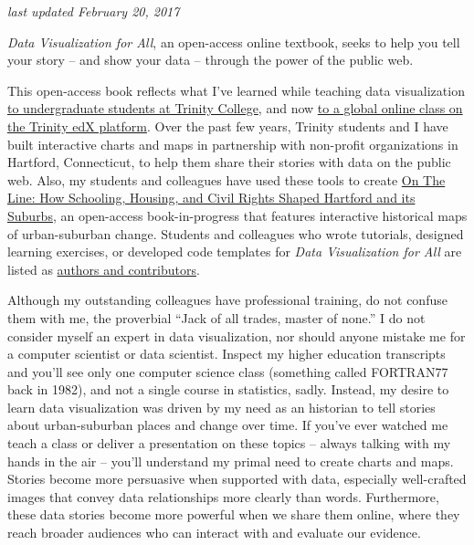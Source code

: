\documentclass[
  english,
]{book}
\begin{document}
\emph{last updated February 20, 2017}

\emph{Data Visualization for All}, an open-access online textbook, seeks to help you tell your story -- and show your data -- through the power of the public web.

This open-access book reflects what I've learned while teaching data visualization \href{http://commons.trincoll.edu/dataviz}{to undergraduate students at Trinity College}, and now \href{https://www.edx.org/school/trinityx}{to a global online class on the Trinity edX platform}. Over the past few years, Trinity students and I have built interactive charts and maps in partnership with non-profit organizations in Hartford, Connecticut, to help them share their stories with data on the public web. Also, my students and colleagues have used these tools to create \href{http://ontheline.trincoll.edu}{On The Line: How Schooling, Housing, and Civil Rights Shaped Hartford and its Suburbs}, an open-access book-in-progress that features interactive historical maps of urban-suburban change. Students and colleagues who wrote tutorials, designed learning exercises, or developed code templates for \emph{Data Visualization for All} are listed as \href{authors}{authors and contributors}.

Although my outstanding colleagues have professional training, do not confuse them with me, the proverbial ``Jack of all trades, master of none.'' I do not consider myself an expert in data visualization, nor should anyone mistake me for a computer scientist or data scientist. Inspect my higher education transcripts and you'll see only one computer science class (something called FORTRAN77 back in 1982), and not a single course in statistics, sadly. Instead, my desire to learn data visualization was driven by my need as an historian to tell stories about urban-suburban places and change over time. If you've ever watched me teach a class or deliver a presentation on these topics -- always talking with my hands in the air -- you'll understand my primal need to create charts and maps. Stories become more persuasive when supported with data, especially well-crafted images that convey data relationships more clearly than words. Furthermore, these data stories become more powerful when we share them online, where they reach broader audiences who can interact with and evaluate our evidence.
\end{document}
